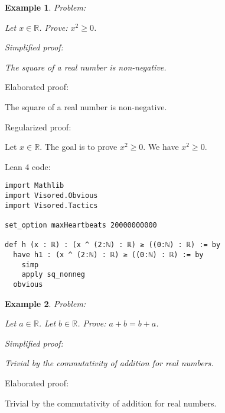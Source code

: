 \documentclass{article}
\newtheorem{example}{Example}
\begin{document}
\begin{example}
Problem:
\begin{tcolorbox}[colback=yellow!10, width=\linewidth]
Let $x\in\mathbb{R}$. Prove: $x^2\ge 0$.
\end{tcolorbox}

Simplified proof:
\begin{tcolorbox}[colback=blue!10, width=\linewidth]
The square of a real number is non-negative.
\end{tcolorbox}
\end{example}

Elaborated proof:
\begin{tcolorbox}[colback=green!10, width=\linewidth]
The square of a real number is non-negative.
\end{tcolorbox}

Regularized proof:
\begin{tcolorbox}[colback=red!10, width=\linewidth]
Let $x\in\mathbb{R}$.
The goal is to prove ${{x}}^2 \ge 0$.
We have ${{x}}^2 \ge 0$.
\end{tcolorbox}

Lean 4 code:
\begin{tcolorbox}[colback=white!10, width=\linewidth]
\begin{lstlisting}[language=Lean4]
import Mathlib
import Visored.Obvious
import Visored.Tactics

set_option maxHeartbeats 20000000000

def h (x : ℝ) : (x ^ (2:ℕ) : ℝ) ≥ ((0:ℕ) : ℝ) := by
  have h1 : (x ^ (2:ℕ) : ℝ) ≥ ((0:ℕ) : ℝ) := by
    simp
    apply sq_nonneg
  obvious

\end{lstlisting}
\end{tcolorbox}


\begin{example}
Problem:
\begin{tcolorbox}[colback=yellow!10, width=\linewidth]
Let $a\in\mathbb{R}$. Let $b\in\mathbb{R}$. Prove: $a+b=b+a$.
\end{tcolorbox}

Simplified proof:
\begin{tcolorbox}[colback=blue!10, width=\linewidth]
Trivial by the commutativity of addition for real numbers.
\end{tcolorbox}
\end{example}

Elaborated proof:
\begin{tcolorbox}[colback=green!10, width=\linewidth]
Trivial by the commutativity of addition for real numbers.
\end{tcolorbox}
\end{document}
